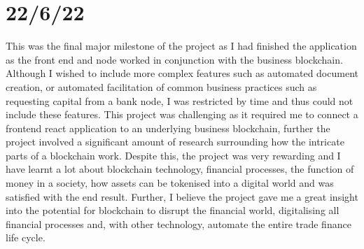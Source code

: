 \section{22/6/22}
This was the final major milestone of the project as I had finished the application as the front end and node worked in conjunction with the business blockchain. Although I wished to include more complex features such as automated document creation, or automated facilitation of common business practices such as requesting capital from a bank node, I was restricted by time and thus could not include these features.  This project was challenging as it required me to connect a frontend react application to an underlying business blockchain, further the project involved a significant amount of research surrounding how the intricate parts of a blockchain work. Despite this, the project was very rewarding and I have learnt a lot about blockchain technology, financial processes, the function of money in a society, how assets can be tokenised into a digital world and was satisfied with the end result. Further, I believe the project gave me a great insight into the potential for blockchain to disrupt the financial world, digitalising all financial processes and, with other technology, automate the entire trade finance life cycle.


